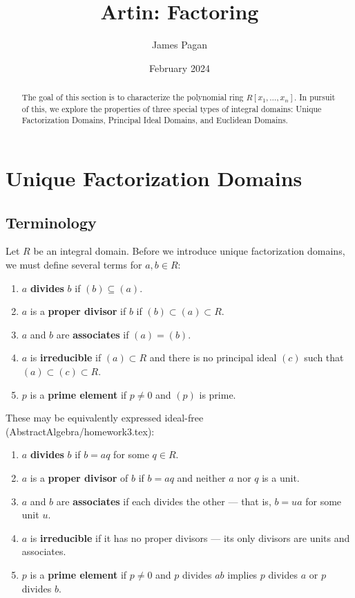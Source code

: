 \documentclass[11pt]{article}
\title{Artin: Factoring}
\author{James Pagan}
\date{February 2024}
\begin{document}
\maketitle
\begin{abstract}
  The goal of this section is to characterize the polynomial ring $R[x_{1}, \ldots, x_{n}]$. In pursuit of this, we explore the properties of three special types of integral domains: Unique Factorization Domains, Principal Ideal Domains, and Euclidean Domains.
\end{abstract}
\tableofcontents
\newpage


\section{Unique Factorization Domains}


\subsection{Terminology}


Let $R$ be an integral domain. Before we introduce unique factorization domains, we must define several terms for $a, b \in R$:

\begin{enumerate}
  \item $a$ \textbf{divides} $b$ if $(b) \subseteq (a)$.
  \item $a$ is a \textbf{proper divisor} if $b$ if $(b) \subset (a) \subset R$.
  \item $a$ and $b$ are \textbf{associates} if $(a) = (b)$.
  \item $a$ is \textbf{irreducible} if $(a) \subset R$ and there is no principal ideal $(c)$ such that $(a) \subset (c) \subset R$.
  \item $p$ is a \textbf{prime element} if $p \ne 0$ and $(p)$ is prime.
\end{enumerate}

These may be equivalently expressed ideal-free (AbstractAlgebra/homework3.tex):
\begin{enumerate}
  \item $a$ \textbf{divides} $b$ if $b = aq$ for some $q \in R$.
  \item $a$ is a \textbf{proper divisor} of $b$ if $b = aq$ and neither $a$ nor $q$ is a unit.
  \item $a$ and $b$ are \textbf{associates} if each divides the other --- that is, $b = ua$ for some unit $u$.
  \item $a$ is \textbf{irreducible} if it has no proper divisors --- its only divisors are units and associates.
  \item $p$ is a \textbf{prime element} if $p \ne 0$ and $p$ divides $ab$ implies $p$ divides $a$ or $p$ divides $b$.
\end{enumerate}
\end{document}
